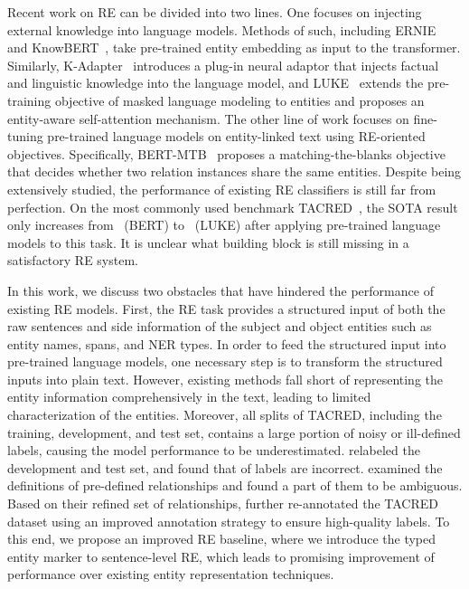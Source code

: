 \documentclass[11pt,a4paper]{article}
\begin{document}
Recent work on RE can be divided into two lines.
One focuses on injecting external knowledge into language models.
Methods of such, including ERNIE~\cite{zhang-etal-2019-ernie} and KnowBERT~\cite{peters-etal-2019-knowledge}, take pre-trained entity embedding as input to the transformer.
Similarly, K-Adapter~\cite{wang2020k} introduces a plug-in neural adaptor that injects factual and linguistic knowledge into the language model, and
LUKE~\cite{yamada-etal-2020-luke} extends the pre-training objective of masked language modeling to entities and proposes an entity-aware self-attention mechanism.
The other line of work focuses on fine-tuning pre-trained language models on entity-linked text using RE-oriented objectives.
Specifically, BERT-MTB~\cite{baldini-soares-etal-2019-matching} proposes a matching-the-blanks objective that decides whether two relation instances share the same entities.
Despite being extensively studied, the performance of existing RE classifiers is still far from perfection.
On the most commonly used benchmark TACRED~\cite{zhang-etal-2017-position}, the SOTA  result only increases from ~(BERT) to ~(LUKE) after applying pre-trained language models to this task.
It is unclear what building block is still missing in a satisfactory RE system. 

In this work, we discuss two obstacles that have hindered the performance of existing RE models.
First, the RE task provides a structured input of both the raw sentences and side information of the subject and object entities such as entity names, spans, and NER types.
In order to feed the structured input into pre-trained language models, one necessary step is to transform the structured inputs into plain text.
However, existing methods fall short of representing the entity information comprehensively in the text, leading to limited characterization of the entities.
Moreover, all splits of TACRED, including the training, development, and test set, contains a large portion of noisy or ill-defined labels, causing the model performance to be underestimated.
\citet{alt-etal-2020-tacred} relabeled the development and test set, and found that  of labels are incorrect.
\citet{stoica2021re} examined the definitions of pre-defined relationships and found a part of them to be ambiguous.
Based on their refined set of relationships, \citeauthor{stoica2021re} further re-annotated the TACRED dataset using an improved annotation strategy to ensure high-quality labels.
To this end, we propose an improved RE baseline, where we introduce the typed entity marker to sentence-level RE, which leads to promising improvement of performance over existing entity representation techniques.
\end{document}
